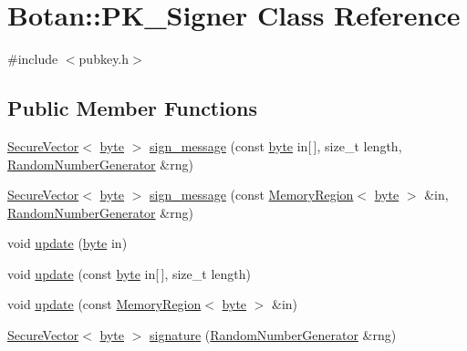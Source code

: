 \hypertarget{classBotan_1_1PK__Signer}{\section{Botan\-:\-:P\-K\-\_\-\-Signer Class Reference}
\label{classBotan_1_1PK__Signer}
}


{\ttfamily \#include $<$pubkey.\-h$>$}

\subsection*{Public Member Functions}
\begin{DoxyCompactItemize}
\item 
\hyperlink{classBotan_1_1SecureVector}{Secure\-Vector}$<$ \hyperlink{namespaceBotan_a7d793989d801281df48c6b19616b8b84}{byte} $>$ \hyperlink{classBotan_1_1PK__Signer_a4a9b1162315ab5805144fe620f653ced}{sign\-\_\-message} (const \hyperlink{namespaceBotan_a7d793989d801281df48c6b19616b8b84}{byte} in\mbox{[}$\,$\mbox{]}, size\-\_\-t length, \hyperlink{classBotan_1_1RandomNumberGenerator}{Random\-Number\-Generator} \&rng)
\item 
\hyperlink{classBotan_1_1SecureVector}{Secure\-Vector}$<$ \hyperlink{namespaceBotan_a7d793989d801281df48c6b19616b8b84}{byte} $>$ \hyperlink{classBotan_1_1PK__Signer_af3aa1fe1e920da0b3f2c20d4c8ddd0a2}{sign\-\_\-message} (const \hyperlink{classBotan_1_1MemoryRegion}{Memory\-Region}$<$ \hyperlink{namespaceBotan_a7d793989d801281df48c6b19616b8b84}{byte} $>$ \&in, \hyperlink{classBotan_1_1RandomNumberGenerator}{Random\-Number\-Generator} \&rng)
\item 
void \hyperlink{classBotan_1_1PK__Signer_a060872024733a2623ec5d0bccc3d900a}{update} (\hyperlink{namespaceBotan_a7d793989d801281df48c6b19616b8b84}{byte} in)
\item 
void \hyperlink{classBotan_1_1PK__Signer_a22c559e6054ba442c7764a4b8e945774}{update} (const \hyperlink{namespaceBotan_a7d793989d801281df48c6b19616b8b84}{byte} in\mbox{[}$\,$\mbox{]}, size\-\_\-t length)
\item 
void \hyperlink{classBotan_1_1PK__Signer_ad4c831ce727ca3654ec23a2f383921b9}{update} (const \hyperlink{classBotan_1_1MemoryRegion}{Memory\-Region}$<$ \hyperlink{namespaceBotan_a7d793989d801281df48c6b19616b8b84}{byte} $>$ \&in)
\item 
\hyperlink{classBotan_1_1SecureVector}{Secure\-Vector}$<$ \hyperlink{namespaceBotan_a7d793989d801281df48c6b19616b8b84}{byte} $>$ \hyperlink{classBotan_1_1PK__Signer_ad73609f27265f1e5fce767015c3bea68}{signature} (\hyperlink{classBotan_1_1RandomNumberGenerator}{Random\-Number\-Generator} \&rng)

\end{DoxyCompactItemize}
